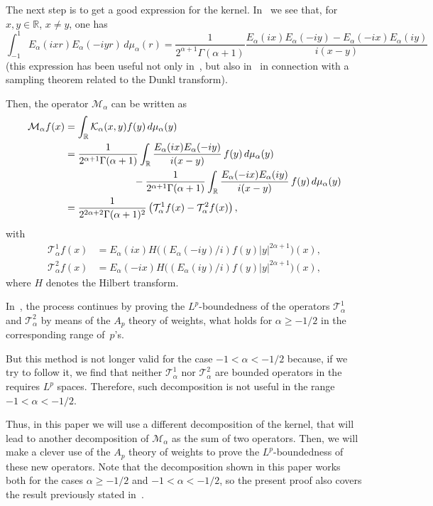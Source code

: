 \documentclass[a4paper]{amsart}
\numberwithin{equation}{section}
\theoremstyle{plain}
\theoremstyle{remark}
\newcommand{\R}{\mathbb{R}}
\newcommand{\Ma}{\mathcal{M}_\alpha} %
\newcommand{\Ka}{\mathcal{K}_\alpha} %
\newcommand{\Ta}{\mathcal{T}_\alpha} %
\newcommand{\mua}{\mu_\alpha}
\begin{document}
The next step is to get a good expression for the kernel.
In~\cite{BCV} we see that, for $x,y \in \R$, $x \ne y$, one has
\begin{equation}
\label{eq:oldkernel}
  \int_{-1}^1 E_{\alpha}(ixr)E_{\alpha}(-iyr)\, d\mua(r)
  = \frac{1}{2^{\alpha+1}\Gamma(\alpha+1)}
    \frac{E_{\alpha}(ix)E_{\alpha}(-iy)-E_{\alpha}(-ix)E_{\alpha}(iy)}{i(x-y)}
\end{equation}
(this expression has been useful not only in~\cite{BCV}, but also in~\cite{CV} 
in connection with a sampling theorem related to the Dunkl transform).

Then, the operator $\Ma$ can be written as
\begin{align}
  \label{eq:olddecom}
  \Ma f(x) &= \int_{\R} \Ka(x,y) f(y) \,d\mua(y) \\
  \notag
  &= \frac{1}{2^{\alpha+1}\Gamma(\alpha+1)}
    \int_{\R} \frac{E_{\alpha}(ix)E_{\alpha}(-iy)}{i(x-y)}\, f(y) \,d\mua(y) \\
  \notag
  &\hspace{0.2\textwidth}\null- \frac{1}{2^{\alpha+1}\Gamma(\alpha+1)}
    \int_{\R} \frac{E_{\alpha}(-ix)E_{\alpha}(iy)}{i(x-y)}\, f(y) \,d\mua(y) \\
  \notag
  &= \frac{1}{2^{2\alpha+2}\Gamma(\alpha+1)^2} \left(\Ta^1 f(x) - \Ta^2 f(x)\right),
\end{align}
with
\begin{align*}
  \Ta^1 f(x)
  &= E_{\alpha}(ix) H\big( (E_{\alpha}(-iy)/i) f(y) |y|^{2\alpha+1}\big)(x), \\
  \Ta^2 f(x)
  &= E_{\alpha}(-ix) H\big( (E_{\alpha}(iy)/i) f(y) |y|^{2\alpha+1}\big)(x),
\end{align*}
where $H$ denotes the Hilbert transform. 

In~\cite{BCV}, the process continues by proving the $L^p$-boundedness of the operators
$\Ta^1$ and $\Ta^2$ by means of the $A_p$ theory of weights, what holds for
$\alpha \ge -1/2$ in the corresponding range of~$p$'s.

But this method is not longer valid for the case $-1<\alpha<-1/2$ because,
if we try to follow it, we find that neither $\Ta^1$ nor $\Ta^2$ are bounded operators
in the requires $L^p$ spaces. Therefore, such decomposition is not useful
in the range $-1<\alpha<-1/2$.

Thus, in this paper we will use a different decomposition of the kernel, that will lead
to another decomposition of $\Ma$ as the sum of two operators. 
Then, we will make a clever use of the $A_p$ theory of weights to prove the $L^p$-boundedness 
of these new operators.
Note that the decomposition shown in this paper works both for the cases $\alpha\ge-1/2$
and $-1<\alpha<-1/2$, so the present proof also covers the result previously stated in~\cite{BCV}.
\end{document}
